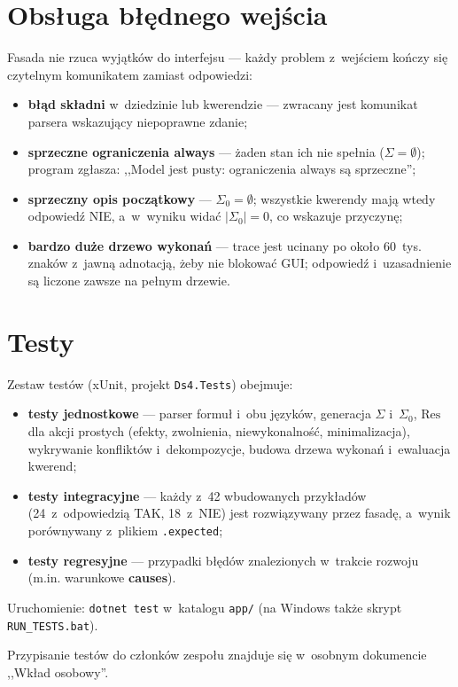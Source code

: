 \documentclass[11pt,a4paper]{article}
\newcommand{\Res}{\mathrm{Res}}
\begin{document}
\section{Obsługa błędnego wejścia}

Fasada nie rzuca wyjątków do interfejsu --- każdy problem z~wejściem kończy
się czytelnym komunikatem zamiast odpowiedzi:

\begin{itemize}
  \item \textbf{błąd składni} w~dziedzinie lub kwerendzie --- zwracany jest
        komunikat parsera wskazujący niepoprawne zdanie;
  \item \textbf{sprzeczne ograniczenia \textbf{always}} --- żaden stan ich nie
        spełnia ($\Sigma = \emptyset$); program zgłasza: ,,Model jest pusty:
        ograniczenia always są sprzeczne'';
  \item \textbf{sprzeczny opis początkowy} --- $\Sigma_0 = \emptyset$;
        wszystkie kwerendy mają wtedy odpowiedź NIE, a~w~wyniku widać
        $|\Sigma_0| = 0$, co wskazuje przyczynę;
  \item \textbf{bardzo duże drzewo wykonań} --- trace jest ucinany po około
        60~tys. znaków z~jawną adnotacją, żeby nie blokować GUI; odpowiedź
        i~uzasadnienie są liczone zawsze na pełnym drzewie.
\end{itemize}

\section{Testy}

Zestaw testów (xUnit, projekt \texttt{Ds4.Tests}) obejmuje:

\begin{itemize}
  \item \textbf{testy jednostkowe} --- parser formuł i~obu języków, generacja
        $\Sigma$ i~$\Sigma_0$, $\Res$ dla akcji prostych (efekty, zwolnienia,
        niewykonalność, minimalizacja), wykrywanie konfliktów i~dekompozycje,
        budowa drzewa wykonań i~ewaluacja kwerend;
  \item \textbf{testy integracyjne} --- każdy z~42 wbudowanych przykładów
        (24~z~odpowiedzią TAK, 18~z~NIE) jest rozwiązywany przez fasadę,
        a~wynik porównywany z~plikiem \texttt{.expected};
  \item \textbf{testy regresyjne} --- przypadki błędów znalezionych w~trakcie
        rozwoju (m.in. warunkowe \textbf{causes}).
\end{itemize}

Uruchomienie: \texttt{dotnet test} w~katalogu \texttt{app/}
(na Windows także skrypt \texttt{RUN\_TESTS.bat}).

Przypisanie testów do członków zespołu znajduje się w~osobnym dokumencie
,,Wkład osobowy''.
\end{document}
